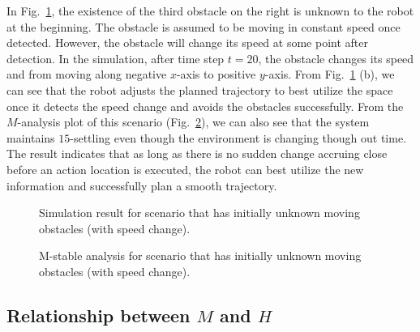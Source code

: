 \documentclass[letterpaper, 10 pt, conference]{ieeeconf}  %
\begin{document}
In Fig.~\ref{fig:3_3}, the existence of the third obstacle on the right is unknown to the robot at the beginning. The obstacle is assumed to be moving in constant speed once detected. However, the obstacle will change its speed at some point after detection. In the simulation, after time step $t=20$, the obstacle changes its speed and from moving along negative $x$-axis to positive $y$-axis. From Fig.~\ref{fig:3_3} (b), we can see that the robot adjusts the planned trajectory to best utilize the space once it detects the speed change and avoids the obstacles successfully. From the $M$-analysis plot of this scenario (Fig.~\ref{fig:3_4}), we can also see that the system maintains $15$-settling even though the environment is changing though out time. The result indicates that as long as there is no sudden change accruing close before an action location is executed, the robot can best utilize the new information and successfully plan a smooth trajectory.






\begin{figure}[t]
      \centering
       
      \caption{Simulation result for scenario that has initially unknown moving obstacles (with speed change). }
      \label{fig:3_3}
\end{figure}


\begin{figure}[t]
      \centering
       
      \caption{M-stable analysis for scenario that has initially unknown moving obstacles (with speed change). }
      \label{fig:3_4}
\end{figure}

\subsection{Relationship between $M$ and $H$}
\end{document}
